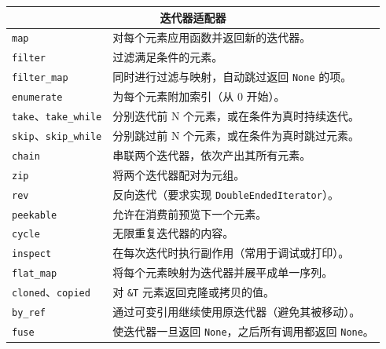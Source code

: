 \begin{table}[ht]
	\centering
	\label{tab:rust-iterator-methods}
	\begin{tabular}{|l|l|}
		\hline
		\multicolumn{2}{|c|}{\textbf{迭代器适配器}}                                                 \\
		\hline
		\verb|map|                             & 对每个元素应用函数并返回新的迭代器。                           \\
		\verb|filter|                          & 过滤满足条件的元素。                                   \\
		\verb|filter_map|                      & 同时进行过滤与映射，自动跳过返回 \verb|None| 的项。             \\
		\verb|enumerate|                       & 为每个元素附加索引（从 0 开始）。                           \\
		\verb|take|、\verb|take_while|          & 分别迭代前 N 个元素，或在条件为真时持续迭代。                     \\
		\verb|skip|、\verb|skip_while|          & 分别跳过前 N 个元素，或在条件为真时跳过元素。                     \\
		\verb|chain|                           & 串联两个迭代器，依次产出其所有元素。                           \\
		\verb|zip|                             & 将两个迭代器配对为元组。                                 \\
		\verb|rev|                             & 反向迭代（要求实现 \verb|DoubleEndedIterator|）。       \\
		\verb|peekable|                        & 允许在消费前预览下一个元素。                               \\
		\verb|cycle|                           & 无限重复迭代器的内容。                                  \\
		\verb|inspect|                         & 在每次迭代时执行副作用（常用于调试或打印）。                       \\
		\verb|flat_map|                        & 将每个元素映射为迭代器并展平成单一序列。                         \\
		\verb|cloned|、\verb|copied|            & 对 \verb|&T| 元素返回克隆或拷贝的值。                     \\
		\verb|by_ref|                          & 通过可变引用继续使用原迭代器（避免其被移动）。                      \\
		\verb|fuse|                            & 使迭代器一旦返回 \verb|None|，之后所有调用都返回 \verb|None|。  \\

\end{tabular}
\end{table}
